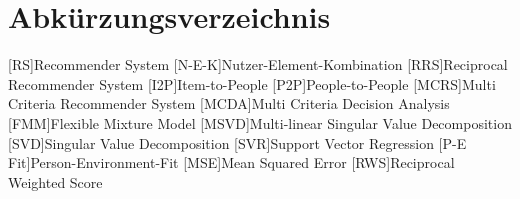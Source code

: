 \renewcommand{\chaptermark}[1]{\markboth{\spacedlowsmallcaps{#1}}{\spacedlowsmallcaps{#1}}}
\renewcommand{\sectionmark}[1]{\markright{\thesection\enspace\spacedlowsmallcaps{#1}}}
\chapter*{Abk\"{u}rzungsverzeichnis}

\begin{acronym}[AWGN]%
  [RS]{Recommender System}
  [N-E-K]{Nutzer-Element-Kombination}
  [RRS]{Reciprocal Recommender System}
  [I2P]{Item-to-People}
  [P2P]{People-to-People}
  [MCRS]{Multi Criteria Recommender System}
  [MCDA]{Multi Criteria Decision Analysis}
  [FMM]{Flexible Mixture Model}
  [MSVD]{Multi-linear Singular Value Decomposition}
  [SVD]{Singular Value Decomposition}
  [SVR]{Support Vector Regression}
  [P-E Fit]{Person-Environment-Fit}
  [MSE]{Mean Squared Error}
  [RWS]{Reciprocal Weighted Score}
\end{acronym}

\cleardoublepage
